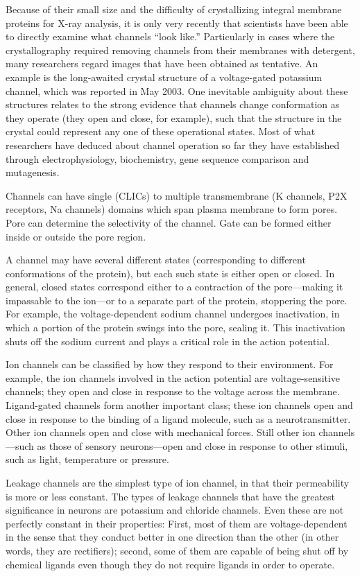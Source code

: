 \documentclass[]{book}
\begin{document}
Because of their small size and the difficulty of crystallizing integral membrane proteins for X-ray analysis, it is only very recently that scientists have been able to directly examine what channels ``look like.'' Particularly in cases where the crystallography required removing channels from their membranes with detergent, many researchers regard images that have been obtained as tentative. An example is the long-awaited crystal structure of a voltage-gated potassium channel, which was reported in May 2003. One inevitable ambiguity about these structures relates to the strong evidence that channels change conformation as they operate (they open and close, for example), such that the structure in the crystal could represent any one of these operational states. Most of what researchers have deduced about channel operation so far they have established through electrophysiology, biochemistry, gene sequence comparison and mutagenesis.

Channels can have single (CLICs) to multiple transmembrane (K channels, P2X receptors, Na channels) domains which span plasma membrane to form pores. Pore can determine the selectivity of the channel. Gate can be formed either inside or outside the pore region.

A channel may have several different states (corresponding to different conformations of the protein), but each such state is either open or closed. In general, closed states correspond either to a contraction of the pore---making it impassable to the ion---or to a separate part of the protein, stoppering the pore. For example, the voltage-dependent sodium channel undergoes inactivation, in which a portion of the protein swings into the pore, sealing it. This inactivation shuts off the sodium current and plays a critical role in the action potential.

Ion channels can be classified by how they respond to their environment. For example, the ion channels involved in the action potential are voltage-sensitive channels; they open and close in response to the voltage across the membrane. Ligand-gated channels form another important class; these ion channels open and close in response to the binding of a ligand molecule, such as a neurotransmitter. Other ion channels open and close with mechanical forces. Still other ion channels---such as those of sensory neurons---open and close in response to other stimuli, such as light, temperature or pressure.

Leakage channels are the simplest type of ion channel, in that their permeability is more or less constant. The types of leakage channels that have the greatest significance in neurons are potassium and chloride channels. Even these are not perfectly constant in their properties: First, most of them are voltage-dependent in the sense that they conduct better in one direction than the other (in other words, they are rectifiers); second, some of them are capable of being shut off by chemical ligands even though they do not require ligands in order to operate.
\end{document}
